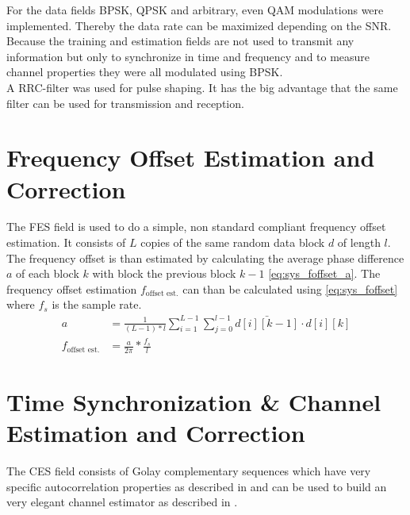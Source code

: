 For the data fields \gls{BPSK}, \gls{QPSK} and arbitrary, even
\gls{QAM} modulations were implemented. Thereby the data rate
can be maximized depending on the \gls{SNR}. \\

Because the training and estimation fields are not used to
transmit any information but only to synchronize in time
and frequency and to measure channel properties they were all
modulated using \gls{BPSK}. \\

A \gls{RRC}-filter was used for pulse shaping. It has the big advantage that
the same filter can be used for transmission and reception. \\

\section{Frequency Offset Estimation and Correction}
The \gls{FES} field is used to do a simple, non standard compliant frequency
offset estimation. It consists of $L$ copies of the same random data block $d$
of length $l$.
The frequency offset is than estimated by calculating the average phase
difference $a$ of each block $k$ with block the previous block $k - 1$
\eqref{eq:sys_foffset_a}. The frequency offset estimation
$f_{\text{offset est.}}$ can than be calculated using \eqref{eq:sys_foffset}
where $f_s$ is the sample rate. \\

\begin{subequations}
  \begin{alignat}{2}
    a &= \frac{1}{(L-1) * l}
    \sum_{i=1}^{L-1} \sum_{j=0}^{l-1} \bar{d[i][k-1]} \cdot d[i][k]
    \label{eq:sys_foffset_a} \\
    f_{\text{offset est.}} &= \frac{a}{2 \pi} * \frac{f_s}{l}
    \label{eq:sys_foffset}
  \end{alignat}
\end{subequations}

\section{Time Synchronization \& Channel Estimation and Correction}
The \gls{CES} field consists of Golay complementary sequences which
have very specific autocorrelation properties as described in
 and can be used to build an very elegant
channel estimator as described in . \\

